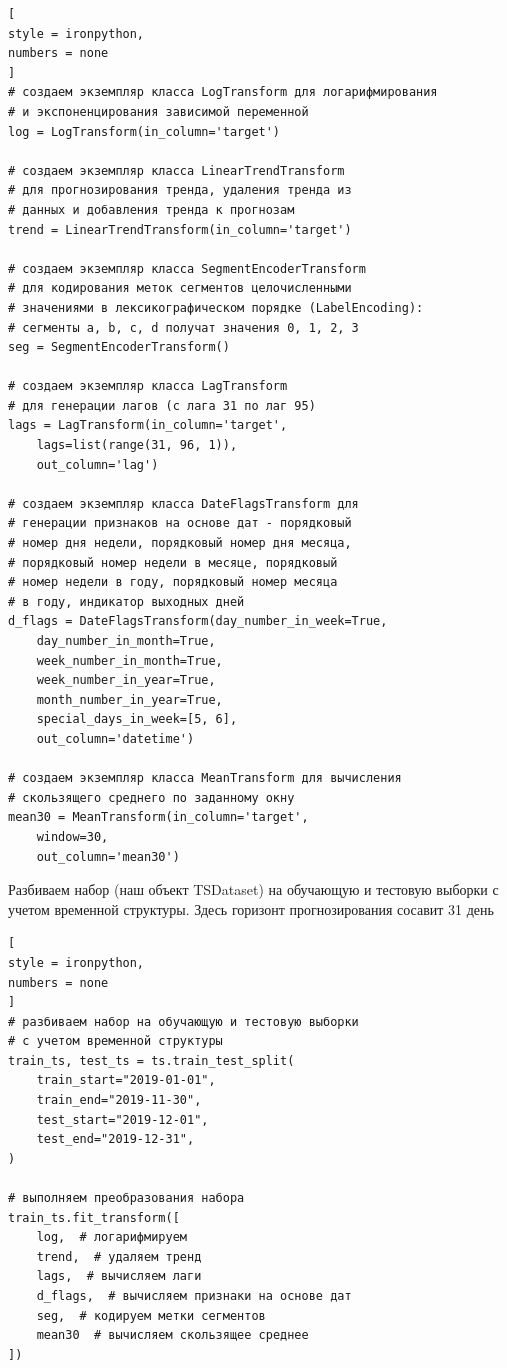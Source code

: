 \documentclass[%
	11pt,
	a4paper,
	utf8,
		]{article}
\begin{document}
\begin{lstlisting}[
style = ironpython,
numbers = none
]
# создаем экземпляр класса LogTransform для логарифмирования 
# и экспоненцирования зависимой переменной
log = LogTransform(in_column='target')

# создаем экземпляр класса LinearTrendTransform 
# для прогнозирования тренда, удаления тренда из 
# данных и добавления тренда к прогнозам
trend = LinearTrendTransform(in_column='target')

# создаем экземпляр класса SegmentEncoderTransform 
# для кодирования меток сегментов целочисленными 
# значениями в лексикографическом порядке (LabelEncoding): 
# сегменты a, b, c, d получат значения 0, 1, 2, 3
seg = SegmentEncoderTransform()

# создаем экземпляр класса LagTransform 
# для генерации лагов (c лага 31 по лаг 95)
lags = LagTransform(in_column='target', 
	lags=list(range(31, 96, 1)), 
	out_column='lag')
	
# создаем экземпляр класса DateFlagsTransform для 
# генерации признаков на основе дат - порядковый 
# номер дня недели, порядковый номер дня месяца,
# порядковый номер недели в месяце, порядковый 
# номер недели в году, порядковый номер месяца 
# в году, индикатор выходных дней
d_flags = DateFlagsTransform(day_number_in_week=True,
	day_number_in_month=True,
	week_number_in_month=True,
	week_number_in_year=True,
	month_number_in_year=True,
	special_days_in_week=[5, 6], 
	out_column='datetime')
	
# создаем экземпляр класса MeanTransform для вычисления 
# скользящего среднего по заданному окну
mean30 = MeanTransform(in_column='target', 
	window=30, 
	out_column='mean30')
\end{lstlisting}

Разбиваем набор (наш объект TSDataset) на обучающую и тестовую выборки с учетом временной структуры. Здесь горизонт прогнозирования сосавит 31 день
\begin{lstlisting}[
style = ironpython,
numbers = none
]
# разбиваем набор на обучающую и тестовую выборки 
# с учетом временной структуры
train_ts, test_ts = ts.train_test_split(
    train_start="2019-01-01",
    train_end="2019-11-30",
    test_start="2019-12-01",
    test_end="2019-12-31",
)

# выполняем преобразования набора
train_ts.fit_transform([
	log,  # логарифмируем
	trend,  # удаляем тренд
	lags,  # вычисляем лаги
	d_flags,  # вычисляем признаки на основе дат
	seg,  # кодируем метки сегментов
	mean30  # вычисляем скользящее среднее
])
\end{lstlisting}
\end{document}

